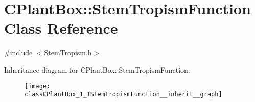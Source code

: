 \hypertarget{classCPlantBox_1_1StemTropismFunction}{}\section{C\+Plant\+Box\+:\+:Stem\+Tropism\+Function Class Reference}
\label{classCPlantBox_1_1StemTropismFunction}


{\ttfamily \#include $<$Stem\+Tropism.\+h$>$}



Inheritance diagram for C\+Plant\+Box\+:\+:Stem\+Tropism\+Function\+:\nopagebreak
\begin{figure}[H]
\begin{center}
\leavevmode
\texttt{[image: classCPlantBox\_1\_1StemTropismFunction\_\_inherit\_\_graph]}
\end{center}
\end{figure}
